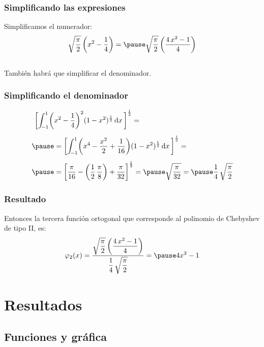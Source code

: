 \documentclass[12pt]{beamer}
\begin{document}
\begin{frame}
\frametitle{Simplificando las expresiones}
Simplificamos el numerador:
\pause
\begin{eqnarray*}
\begin{aligned}
\sqrt{\dfrac{\pi}{2}} \, \bigg( x^{2} - \dfrac{1}{4} \bigg) = \pause \sqrt{\dfrac{\pi}{2}} \,\bigg( \dfrac{4 \, x^{2} - 1}{4} \bigg) %
\end{aligned}
\end{eqnarray*}
\\
\bigskip
\pause
También habrá que simplificar el denominador.
\end{frame}
\begin{frame}
\frametitle{Simplificando el denominador}
\begin{eqnarray*}
\begin{aligned}
\bigg[ \scaleint{5ex}_{\bs -1}^{1} \bigg( &x^{2} - \dfrac{1}{4} \bigg)^{2} (1 -x^{2})^{\frac{1}{2}} \dd{x} \bigg]^{\frac{1}{2}} = \\[0.5em] \pause
&= \bigg[ \scaleint{5ex}_{\bs -1}^{1} \bigg( x^{4} - \dfrac{x^{2}}{2} + \dfrac{1}{16} \bigg) (1 -x^{2})^{\frac{1}{2}} \dd{x} \bigg]^{\frac{1}{2}} = \\[0.5em] \pause
&= \bigg[ \dfrac{\pi}{16} - \left( \dfrac{1}{2} \, \dfrac{\pi}{8} \right) + \dfrac{\pi}{32} \bigg]^{\frac{1}{2}} = \pause \sqrt{\dfrac{\pi}{32}} = \pause \dfrac{1}{4} \, \sqrt{\dfrac{\pi}{2}}
\end{aligned}
\end{eqnarray*}
\end{frame}
\begin{frame}
\frametitle{Resultado}
Entonces la tercera función ortogonal que corresponde al polinomio de Chebyshev de tipo II, es:
\pause
\begin{eqnarray*}
\begin{aligned}
\varphi_{2}(x) = \dfrac{\sqrt{\dfrac{\pi}{2}} \,\bigg( \dfrac{4 \, x^{2} - 1}{4} \bigg)}{\dfrac{1}{4} \, \sqrt{\dfrac{\pi}{2}}} = \pause 4 x^{2} - 1
\end{aligned}
\end{eqnarray*}
\end{frame}

\section{Resultados}
\subsection{Funciones y gráfica}
\end{document}
